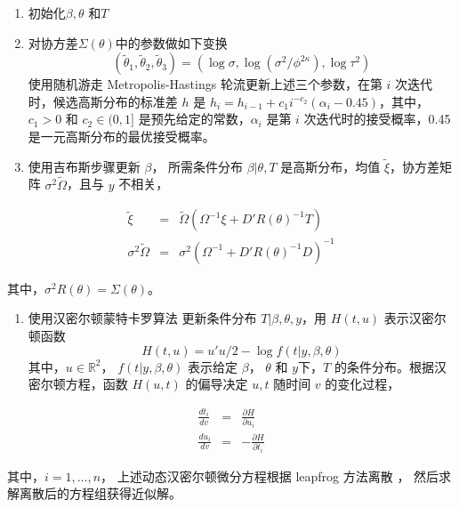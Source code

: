 \documentclass[12pt,a4paper,UTF8,twoside]{book}
\providecommand{\tightlist}{%
  \setlength{\itemsep}{0pt}\setlength{\parskip}{0pt}}
\theoremstyle{definition}
\theoremstyle{definition}
\theoremstyle{definition}
\theoremstyle{remark}
\begin{document}
\begin{enumerate}
\def\labelenumi{\arabic{enumi}.}
\tightlist
\item
  初始化\(\beta, \theta\) 和\(T\)
\item
  对协方差\(\Sigma(\theta)\)中的参数做如下变换\citep{Christensen2006}
  \[(\tilde{\theta}_{1}, \tilde{\theta}_{2}, \tilde{\theta}_{3}) = (\log \sigma, \log (\sigma^2/\phi^{2\kappa}), \log \tau^2)\]
  使用随机游走 Metropolis-Hastings 轮流更新上述三个参数，在第 \(i\)
  次迭代时，候选高斯分布的标准差 \(h\) 是
  \(h_{i} = h_{i-1} + c_{1}i^{-c_{2}}(\alpha_{i}-0.45)\)，其中，\(c_{1} > 0\)
  和 \(c_{2} \in (0,1]\) 是预先给定的常数，\(\alpha_i\) 是第 \(i\)
  次迭代时的接受概率，0.45 是一元高斯分布的最优接受概率。
\item
  使用吉布斯步骤更新 \(\beta\)， 所需条件分布 \(\beta|\theta,T\)
  是高斯分布，均值 \(\tilde{\xi}\)，协方差矩阵
  \(\sigma^2\tilde{\Omega}\)，且与 \(y\) 不相关，
\end{enumerate}

\begin{eqnarray*}
\tilde{\xi} & = & \tilde{\Omega}(\Omega^{-1}\xi+D' R(\theta)^{-1} T) \\
\sigma^2 \tilde{\Omega} & = & \sigma^2(\Omega^{-1} + D' R(\theta)^{-1} D)^{-1}
\end{eqnarray*}

\noindent 其中，\(\sigma^2 R(\theta) = \Sigma(\theta)\)。

\begin{enumerate}
\def\labelenumi{\arabic{enumi}.}
\setcounter{enumi}{3}
\tightlist
\item
  使用汉密尔顿蒙特卡罗算法 \citep{Brooks2011} 更新条件分布
  \(T|\beta,\theta,y\)，用 \(H(t,u)\) 表示汉密尔顿函数
  \[H(t, u) = u' u/2 - \log f(t | y, \beta, \theta)\]
  \noindent 其中，\(u\in\mathbb{R}^2\)， \(f(t | y, \beta, \theta)\)
  表示给定 \(\beta\)， \(\theta\) 和 \(y\)下，\(T\)
  的条件分布。根据汉密尔顿方程，函数 \(H(u, t)\) 的偏导决定 \(u,t\)
  随时间 \(v\) 的变化过程，
\end{enumerate}

\begin{eqnarray*}
\frac{d t_{i}}{d v} & = & \frac{\partial H}{\partial u_{i}} \\
\frac{d u_{i}}{d v} & = & -\frac{\partial H}{\partial t_{i}}
\end{eqnarray*}

\noindent 其中，\(i = 1,\ldots, n\)， 上述动态汉密尔顿微分方程根据
leapfrog 方法离散 \citep{Brooks2011}，
然后求解离散后的方程组获得近似解。
\end{document}
